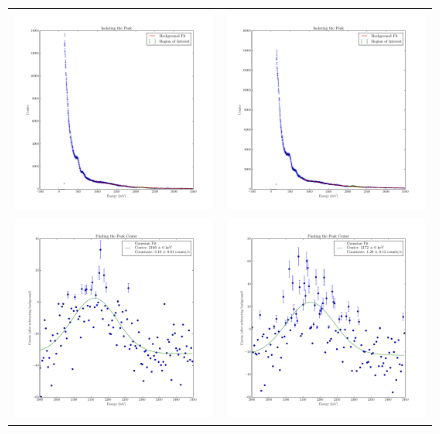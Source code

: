 \documentclass{article}
\begin{document}
  \begin{figure}[!htb]
    \centering
    \begin{tabular}{c c}
      \includegraphics[width=.5\linewidth]{../plots/peak_isolation_lead_portclosed.pdf} & \includegraphics[width=.5\linewidth]{../plots/peak_isolation_lead_portopen.pdf} \\
      \includegraphics[width=.5\linewidth]{../plots/peak_center_lead_portclosed.pdf} & \includegraphics[width=.5\linewidth]{../plots/peak_center_lead_portopen.pdf} \\

\end{tabular}
\end{figure}
\end{document}
